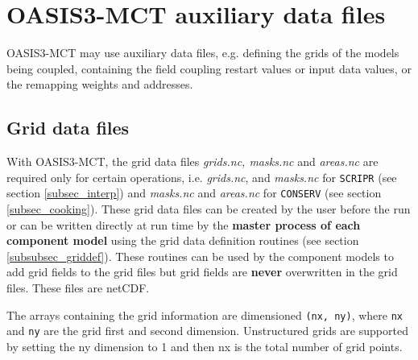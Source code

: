 \newpage
\chapter{OASIS3-MCT auxiliary data files}
\label{sec_auxiliary}

OASIS3-MCT may use auxiliary data files, e.g. defining the grids of
the models being coupled, containing the field coupling restart values
or input data values, or the remapping weights and addresses.

\section{Grid data files}
\label{subsec_griddata}

With OASIS3-MCT, the grid data files {\em grids.nc, masks.nc} and {\em
  areas.nc} are required only for certain operations, i.e.  {\em grids.nc}, and {\em
  masks.nc} for {\tt SCRIPR} (see section
\ref{subsec_interp}) and {\em masks.nc} and {\em areas.nc} 
for {\tt CONSERV} (see section \ref{subsec_cooking}). These grid data files can be
created by the user before the run or can be written directly at run
time by the {\bf master process of each component model} using the
grid data definition routines (see section \ref{subsubsec_griddef}).
These routines can be used by the component models to add
grid fields to the grid files but grid fields
are {\bf never} overwritten in the grid files. These files are netCDF.

The arrays containing the grid information are dimensioned {\tt (nx, ny)},
where {\tt nx} and {\tt ny} are the grid first and second dimension.
Unstructured grids are supported by setting the ny dimension to 1
and then nx is the total number of grid points.

